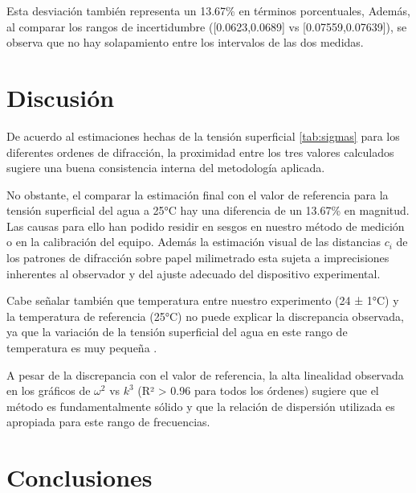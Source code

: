 \vspace{\baselineskip}
Esta desviación también representa un 13.67\% en términos porcentuales,  Además, al comparar los rangos de incertidumbre ([0.0623,0.0689] vs [0.07559,0.07639]), se observa que no hay solapamiento entre los intervalos de las dos medidas.







\section{Discusión}


De acuerdo  al estimaciones hechas de la tensión superficial \ref{tab:sigmas} para los diferentes ordenes de difracción, la proximidad entre los tres valores calculados sugiere una buena consistencia interna del metodología aplicada.

\vspace{\baselineskip}

No obstante, el comparar la estimación final con el valor de referencia para la tensión superficial del agua a 25°C hay una diferencia de  un 13.67\% en magnitud. Las causas para ello han podido residir en sesgos en nuestro método de medición o en la calibración del equipo. Además la estimación visual de las distancias  $c_i$ de los patrones de difracción sobre papel milimetrado esta sujeta a imprecisiones inherentes al observador y del ajuste adecuado del dispositivo experimental.

\vspace{\baselineskip}

Cabe señalar también que temperatura entre nuestro experimento (24 ± 1°C) y la temperatura de referencia (25°C) no puede explicar la discrepancia observada, ya que la variación de la tensión superficial del agua en este rango de temperatura es muy pequeña \cite{Vargaftik1983}.

\vspace{\baselineskip}

A pesar de la discrepancia con el valor de referencia, la alta linealidad observada en los gráficos de $\omega^2$ vs $k^3$  (R² > 0.96 para todos los órdenes) sugiere que el método es fundamentalmente sólido y que la relación de dispersión utilizada es apropiada para este rango de frecuencias.


\section{Conclusiones}

